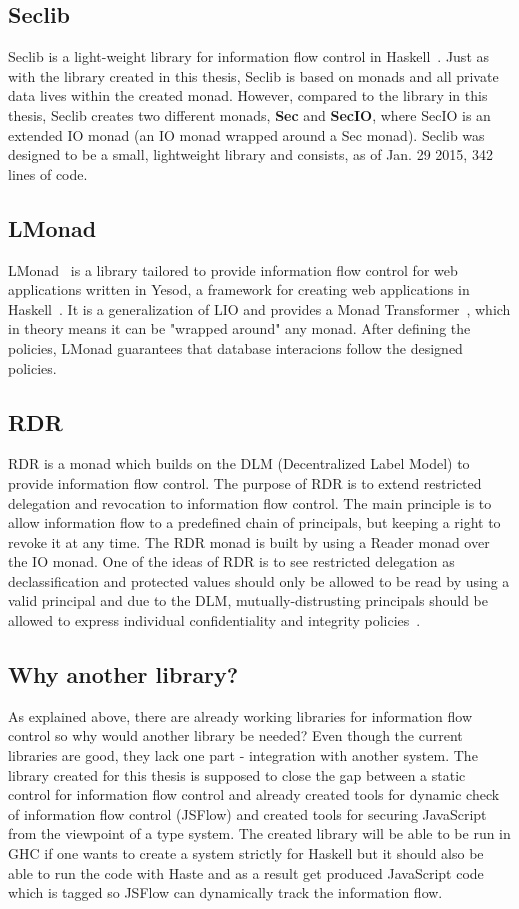 \subsection{Seclib}
Seclib is a light-weight library for information flow control in Haskell~\cite{seclib, seclib_git}. Just as with the library created in this thesis, Seclib is based on monads and all private data lives within the created monad. However, compared to the library in this thesis, Seclib creates two different monads, \textbf{Sec} and \textbf{SecIO}, where SecIO is an extended IO monad (an IO monad wrapped around a Sec monad). Seclib was designed to be a small, lightweight library and consists, as of Jan. 29 2015, 342 lines of code.
\subsection{LMonad}
LMonad~\cite{lmonad} is a library tailored to provide information flow control for web applications written in Yesod, a framework for creating web applications in Haskell~\cite{yesod}. It is a generalization of LIO and provides a Monad Transformer~\cite{monad-transformer}, which in theory means it can be "wrapped around" any monad. After defining the policies, LMonad guarantees that database interacions follow the designed policies.
\subsection{RDR}
RDR is a monad which builds on the DLM (Decentralized Label Model) to provide information flow control. The purpose of RDR is to extend restricted delegation and revocation to information flow control. The main principle is to allow information flow to a predefined chain of principals, but keeping a right to revoke it at any time. The RDR monad is built by using a Reader monad over the IO monad. One of the ideas of RDR is to see restricted delegation as declassification and protected values should only be allowed to be read by using a valid principal and due to the DLM, mutually-distrusting principals should be allowed to express individual confidentiality and integrity policies~\cite{rdr}.
\subsection{Why another library?}
As explained above, there are already working libraries for information flow control so why would another library be needed? Even though the current libraries are good, they lack one part - integration with another system. The library created for this thesis is supposed to close the gap between a static control for information flow control and already created tools for dynamic check of information flow control (JSFlow) and created tools for securing JavaScript from the viewpoint of a type system. The created library will be able to be run in GHC if one wants to create a system strictly for Haskell but it should also be able to run the code with Haste and as a result get produced JavaScript code which is tagged so JSFlow can dynamically track the information flow.
